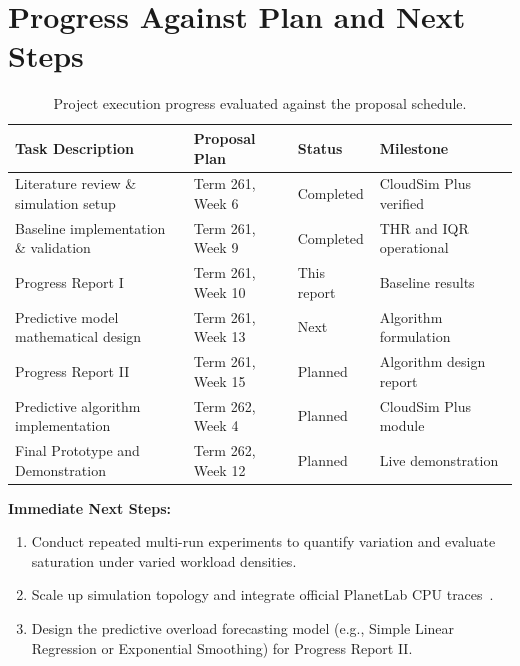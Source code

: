 \documentclass[11pt,a4paper]{article}
\begin{document}
\section{Progress Against Plan and Next Steps}
\begin{table}[H]
\centering
\small
\setlength{\tabcolsep}{5pt}
\begin{tabular}{@{}llll@{}}
\toprule
\textbf{Task Description} & \textbf{Proposal Plan} & \textbf{Status} & \textbf{Milestone} \\ \midrule
Literature review \& simulation setup   & Term 261, Week 6  & Completed   & CloudSim Plus verified \\
Baseline implementation \& validation   & Term 261, Week 9  & Completed   & THR and IQR operational \\
Progress Report I                       & Term 261, Week 10 & This report & Baseline results \\
Predictive model mathematical design    & Term 261, Week 13 & Next        & Algorithm formulation \\
Progress Report II                      & Term 261, Week 15 & Planned     & Algorithm design report \\
Predictive algorithm implementation     & Term 262, Week 4  & Planned     & CloudSim Plus module \\
Final Prototype and Demonstration       & Term 262, Week 12 & Planned     & Live demonstration \\
\bottomrule
\end{tabular}
\caption{Project execution progress evaluated against the proposal schedule.}
\label{tab:plan}
\end{table}

\noindent \textbf{Immediate Next Steps:}
\begin{enumerate}[leftmargin=1.8em, itemsep=2pt]
  \item Conduct repeated multi-run experiments to quantify variation and evaluate saturation under varied workload densities.
  \item Scale up simulation topology and integrate official PlanetLab CPU traces~\cite{park2006comon}.
  \item Design the predictive overload forecasting model (e.g., Simple Linear Regression or Exponential Smoothing) for Progress Report II.
\end{enumerate}
\end{document}
